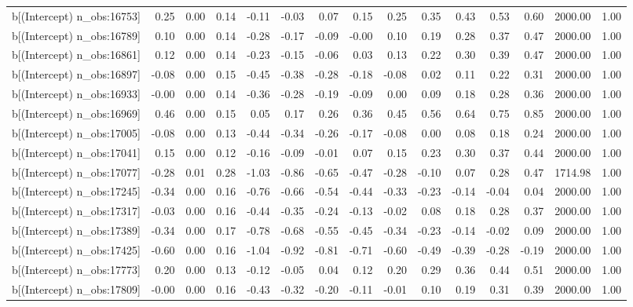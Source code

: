\begin{table}[ht]
\begin{tabular}{rrrrrrrrrrrrrrr}
  b[(Intercept) n\_obs:16753] & 0.25 & 0.00 & 0.14 & -0.11 & -0.03 & 0.07 & 0.15 & 0.25 & 0.35 & 0.43 & 0.53 & 0.60 & 2000.00 & 1.00 \\ 
  b[(Intercept) n\_obs:16789] & 0.10 & 0.00 & 0.14 & -0.28 & -0.17 & -0.09 & -0.00 & 0.10 & 0.19 & 0.28 & 0.37 & 0.47 & 2000.00 & 1.00 \\ 
  b[(Intercept) n\_obs:16861] & 0.12 & 0.00 & 0.14 & -0.23 & -0.15 & -0.06 & 0.03 & 0.13 & 0.22 & 0.30 & 0.39 & 0.47 & 2000.00 & 1.00 \\ 
  b[(Intercept) n\_obs:16897] & -0.08 & 0.00 & 0.15 & -0.45 & -0.38 & -0.28 & -0.18 & -0.08 & 0.02 & 0.11 & 0.22 & 0.31 & 2000.00 & 1.00 \\ 
  b[(Intercept) n\_obs:16933] & -0.00 & 0.00 & 0.14 & -0.36 & -0.28 & -0.19 & -0.09 & 0.00 & 0.09 & 0.18 & 0.28 & 0.36 & 2000.00 & 1.00 \\ 
  b[(Intercept) n\_obs:16969] & 0.46 & 0.00 & 0.15 & 0.05 & 0.17 & 0.26 & 0.36 & 0.45 & 0.56 & 0.64 & 0.75 & 0.85 & 2000.00 & 1.00 \\ 
  b[(Intercept) n\_obs:17005] & -0.08 & 0.00 & 0.13 & -0.44 & -0.34 & -0.26 & -0.17 & -0.08 & 0.00 & 0.08 & 0.18 & 0.24 & 2000.00 & 1.00 \\ 
  b[(Intercept) n\_obs:17041] & 0.15 & 0.00 & 0.12 & -0.16 & -0.09 & -0.01 & 0.07 & 0.15 & 0.23 & 0.30 & 0.37 & 0.44 & 2000.00 & 1.00 \\ 
  b[(Intercept) n\_obs:17077] & -0.28 & 0.01 & 0.28 & -1.03 & -0.86 & -0.65 & -0.47 & -0.28 & -0.10 & 0.07 & 0.28 & 0.47 & 1714.98 & 1.00 \\ 
  b[(Intercept) n\_obs:17245] & -0.34 & 0.00 & 0.16 & -0.76 & -0.66 & -0.54 & -0.44 & -0.33 & -0.23 & -0.14 & -0.04 & 0.04 & 2000.00 & 1.00 \\ 
  b[(Intercept) n\_obs:17317] & -0.03 & 0.00 & 0.16 & -0.44 & -0.35 & -0.24 & -0.13 & -0.02 & 0.08 & 0.18 & 0.28 & 0.37 & 2000.00 & 1.00 \\ 
  b[(Intercept) n\_obs:17389] & -0.34 & 0.00 & 0.17 & -0.78 & -0.68 & -0.55 & -0.45 & -0.34 & -0.23 & -0.14 & -0.02 & 0.09 & 2000.00 & 1.00 \\ 
  b[(Intercept) n\_obs:17425] & -0.60 & 0.00 & 0.16 & -1.04 & -0.92 & -0.81 & -0.71 & -0.60 & -0.49 & -0.39 & -0.28 & -0.19 & 2000.00 & 1.00 \\ 
  b[(Intercept) n\_obs:17773] & 0.20 & 0.00 & 0.13 & -0.12 & -0.05 & 0.04 & 0.12 & 0.20 & 0.29 & 0.36 & 0.44 & 0.51 & 2000.00 & 1.00 \\ 
  b[(Intercept) n\_obs:17809] & -0.00 & 0.00 & 0.16 & -0.43 & -0.32 & -0.20 & -0.11 & -0.01 & 0.10 & 0.19 & 0.31 & 0.39 & 2000.00 & 1.00 \\ 

\end{tabular}
\end{table}
